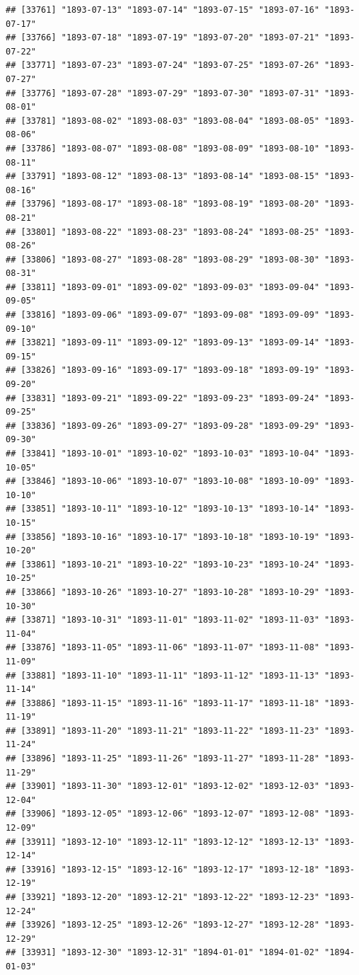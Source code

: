 \documentclass{article}\usepackage[]{graphicx}\usepackage[]{color}
\makeatletter
\newenvironment{kframe}{%
 \def\at@end@of@kframe{}%
 \ifinner\ifhmode%
  \def\at@end@of@kframe{\end{minipage}}%
  \begin{minipage}{\columnwidth}%
 \fi\fi%
 \def\FrameCommand##1{\hskip\@totalleftmargin \hskip-\fboxsep
 \colorbox{shadecolor}{##1}\hskip-\fboxsep
     \hskip-\linewidth \hskip-\@totalleftmargin \hskip\columnwidth}%
 \MakeFramed {\advance\hsize-\width
   \@totalleftmargin\z@ \linewidth\hsize
   \@setminipage}}%
 {\par\unskip\endMakeFramed%
 \at@end@of@kframe}
\newenvironment{knitrout}{}{} %
\makeatother
\begin{document}
\begin{description}
\begin{knitrout}
\begin{kframe}
\begin{verbatim}
## [33761] "1893-07-13" "1893-07-14" "1893-07-15" "1893-07-16" "1893-07-17"
## [33766] "1893-07-18" "1893-07-19" "1893-07-20" "1893-07-21" "1893-07-22"
## [33771] "1893-07-23" "1893-07-24" "1893-07-25" "1893-07-26" "1893-07-27"
## [33776] "1893-07-28" "1893-07-29" "1893-07-30" "1893-07-31" "1893-08-01"
## [33781] "1893-08-02" "1893-08-03" "1893-08-04" "1893-08-05" "1893-08-06"
## [33786] "1893-08-07" "1893-08-08" "1893-08-09" "1893-08-10" "1893-08-11"
## [33791] "1893-08-12" "1893-08-13" "1893-08-14" "1893-08-15" "1893-08-16"
## [33796] "1893-08-17" "1893-08-18" "1893-08-19" "1893-08-20" "1893-08-21"
## [33801] "1893-08-22" "1893-08-23" "1893-08-24" "1893-08-25" "1893-08-26"
## [33806] "1893-08-27" "1893-08-28" "1893-08-29" "1893-08-30" "1893-08-31"
## [33811] "1893-09-01" "1893-09-02" "1893-09-03" "1893-09-04" "1893-09-05"
## [33816] "1893-09-06" "1893-09-07" "1893-09-08" "1893-09-09" "1893-09-10"
## [33821] "1893-09-11" "1893-09-12" "1893-09-13" "1893-09-14" "1893-09-15"
## [33826] "1893-09-16" "1893-09-17" "1893-09-18" "1893-09-19" "1893-09-20"
## [33831] "1893-09-21" "1893-09-22" "1893-09-23" "1893-09-24" "1893-09-25"
## [33836] "1893-09-26" "1893-09-27" "1893-09-28" "1893-09-29" "1893-09-30"
## [33841] "1893-10-01" "1893-10-02" "1893-10-03" "1893-10-04" "1893-10-05"
## [33846] "1893-10-06" "1893-10-07" "1893-10-08" "1893-10-09" "1893-10-10"
## [33851] "1893-10-11" "1893-10-12" "1893-10-13" "1893-10-14" "1893-10-15"
## [33856] "1893-10-16" "1893-10-17" "1893-10-18" "1893-10-19" "1893-10-20"
## [33861] "1893-10-21" "1893-10-22" "1893-10-23" "1893-10-24" "1893-10-25"
## [33866] "1893-10-26" "1893-10-27" "1893-10-28" "1893-10-29" "1893-10-30"
## [33871] "1893-10-31" "1893-11-01" "1893-11-02" "1893-11-03" "1893-11-04"
## [33876] "1893-11-05" "1893-11-06" "1893-11-07" "1893-11-08" "1893-11-09"
## [33881] "1893-11-10" "1893-11-11" "1893-11-12" "1893-11-13" "1893-11-14"
## [33886] "1893-11-15" "1893-11-16" "1893-11-17" "1893-11-18" "1893-11-19"
## [33891] "1893-11-20" "1893-11-21" "1893-11-22" "1893-11-23" "1893-11-24"
## [33896] "1893-11-25" "1893-11-26" "1893-11-27" "1893-11-28" "1893-11-29"
## [33901] "1893-11-30" "1893-12-01" "1893-12-02" "1893-12-03" "1893-12-04"
## [33906] "1893-12-05" "1893-12-06" "1893-12-07" "1893-12-08" "1893-12-09"
## [33911] "1893-12-10" "1893-12-11" "1893-12-12" "1893-12-13" "1893-12-14"
## [33916] "1893-12-15" "1893-12-16" "1893-12-17" "1893-12-18" "1893-12-19"
## [33921] "1893-12-20" "1893-12-21" "1893-12-22" "1893-12-23" "1893-12-24"
## [33926] "1893-12-25" "1893-12-26" "1893-12-27" "1893-12-28" "1893-12-29"
## [33931] "1893-12-30" "1893-12-31" "1894-01-01" "1894-01-02" "1894-01-03"

\end{verbatim}
\end{kframe}
\end{knitrout}
\end{description}
\end{document}
